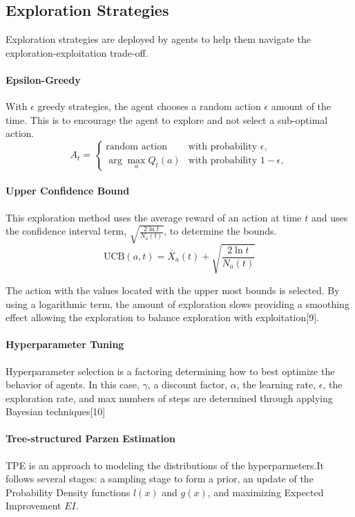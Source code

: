 \documentclass[conference]{IEEEtran}
\begin{document}
\subsection{Exploration Strategies}
Exploration strategies are deployed by agents to help them navigate the exploration-exploitation trade-off. 

\paragraph{Epsilon-Greedy}
With $\epsilon$ greedy strategies, the agent chooses a random action  $\epsilon$ amount of the time. This is to encourage the agent to explore and not select a sub-optimal action. 
\[
A_t = 
\begin{cases} 
\text{random action} & \text{with probability } \epsilon, \\
\arg\max_a Q_t(a) & \text{with probability } 1 - \epsilon,
\end{cases}
\]
\paragraph{Upper Confidence Bound}

This exploration method uses the average reward of an action at time $t$ and uses the confidence interval term,  $\sqrt{\frac{2 \ln t}{N_a(t)}}$, to determine the bounds. 
\[
\text{UCB}(a, t) = \bar{X}_a(t) + \sqrt{\frac{2 \ln t}{N_a(t)}}
\]

The action with the values located with the upper most bounds is selected. By using a logarithmic term, the amount of exploration slows providing a smoothing effect allowing the exploration to balance exploration with exploitation[9]. 

\paragraph{Hyperparameter Tuning}
Hyperparameter selection is a factoring determining how to best optimize the behavior of agents. In this case, $\gamma$, a discount factor, $\alpha$, the learning rate, $\epsilon$, the exploration rate, and max numbers of steps are determined through applying Bayesian techniques[10] 

\paragraph{ Tree-structured Parzen Estimation}
TPE is an approach to modeling the distributions of the hyperparmeters.It follows several stages: a sampling stage to form a prior, an update of the Probability Density functions $l(x)$ and $g(x)$, and maximizing Expected Improvement $EI$.
\end{document}
